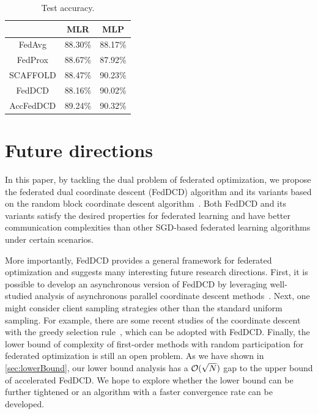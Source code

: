 \begin{table}[t]
    \centering
    \begin{tabular}{ccc}
    \toprule
                    &  MLR      & MLP \\ \hline
        FedAvg      &  88.30\%  & 88.17\% \\
        FedProx     &  88.67\%  & 87.92\% \\ 
        SCAFFOLD    &  88.47\%  & 90.23\% \\
        FedDCD      &  88.16\%  & 90.02\% \\
        AccFedDCD   &  89.24\%  & 90.32\% \\
    \bottomrule
    \end{tabular}
    \caption{Test accuracy.}
    \label{tab:exp3}
\end{table}

\section{Future directions}
\label{sec:conclusion}

In this paper, by tackling the dual problem of federated optimization, we propose the federated dual coordinate descent (FedDCD) algorithm and its variants based on the random block coordinate descent algorithm~\citep{necoara2017random}. Both FedDCD and its variants satisfy the desired properties for federated learning and have better communication complexities than other SGD-based federated learning algorithms under certain scenarios. 

More importantly, FedDCD provides a general framework for federated optimization and suggests many interesting future research directions. First, it is possible to develop an asynchronous version of FedDCD by leveraging well-studied analysis of asynchronous parallel coordinate descent methods~\citep{LiuW15,0002WRBS15}. Next, one might consider client sampling strategies other than the standard uniform sampling. For example, there are some recent studies of the coordinate descent with the greedy selection rule~\citep{NutiniSLFK15,BCD_julie,fang2020greed}, which can be adopted with FedDCD. Finally, the lower bound of complexity of first-order methods with random participation for federated optimization is still an open problem. As we have shown in \autoref{sec:lowerBound}, our lower bound analysis has a $\mathcal{O}(\sqrt{N})$ gap to the upper bound of accelerated FedDCD. We hope to explore whether the lower bound can be further tightened or an algorithm with a faster convergence rate can be developed. 


